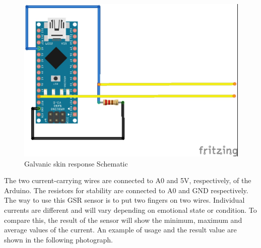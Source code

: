 \documentclass{report}
\begin{document}
\begin{figure}[H]
\begin{center}
\includegraphics[scale=1.25]{images/GSR.jpg}
\caption{Galvanic skin response Schematic}
\end{center}
\end{figure}

The two current-carrying wires are connected to A0 and 5V, respectively, of the Arduino. The resistors for stability are connected to A0 and GND respectively.	\\

The way to use this GSR sensor is to put two fingers on two wires. Individual currents are different and will vary depending on emotional state or condition. To compare this, the result of the sensor will show the minimum, maximum and average values ​​of the current. An example of usage and the result value are shown in the following photograph.

%

%	
\end{document}
